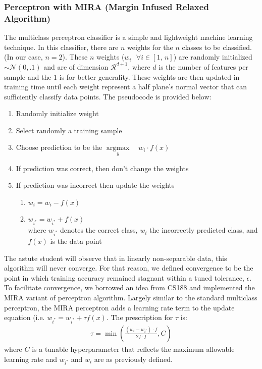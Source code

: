 \documentclass[conference]{IEEEtran}
\begin{document}
\subsubsection{ Perceptron with MIRA (Margin Infused Relaxed Algorithm)} 
The multiclass perceptron classifier is a simple and lightweight machine learning technique. In this classifier, there are $n$ weights for the $n$ classes to be classified. (In our case, $n = 2$). These $n$ weights ($w_i \ \ \ \forall i \in [1, \,n]$) are randomly initialized $\sim\mathcal{N}(0,.1)$ and are of dimension $\mathcal{R}^{d+1}$, where $d$ is the number of features per sample and the $1$ is for better generality. These weights are then updated in training time until each weight represent a half plane's normal vector that can sufficiently classify data points. The pseudocode is provided below:
\begin{enumerate}
    \item Randomly initialize weight
    \item Select randomly a training sample
    \item Choose prediction to be the $\underset{y}{\operatorname{argmax}} \quad w_i \cdot f(x)$
    \item If prediction was correct, then don't change the weights
    \item If prediction was incorrect then update the weights 
    \begin{enumerate}
        \item $w_i = w_i - f(x)$
        \item $w_{i^*} = w_{i^*} + f(x)$ \\
        where $w_{i^*}$ denotes the correct class, $w_i$ the incorrectly predicted class, and $f(x)$ is the data point
    \end{enumerate}
\end{enumerate} 
The astute student will observe that in linearly non-separable data, this algorithm will never converge. For that reason, we defined convergence to be the point in which training accuracy remained stagnant within a tuned tolerance, $\epsilon$. \\
To facilitate convergence, we borrowed an idea from CS188 and implemented the MIRA variant of perceptron algorithm. Largely similar to the standard multiclass perceptron, the MIRA perceptron adds a learning rate term to the update equation (i.e. $w_{i^*} = w_{i^*} + \tau f(x)$. The prescription for $\tau$ is:
\begin{align*}
  \tau = \min{\left(\frac{(w_{i} - w_{i^*})\cdot f}{2 f \cdot f},C\right)}
\end{align*}
where $C$ is a tunable hyperparameter that reflects the maximum allowable learning rate and $w_{i^*}$ and $w_i$ are as previously defined.
\end{document}
